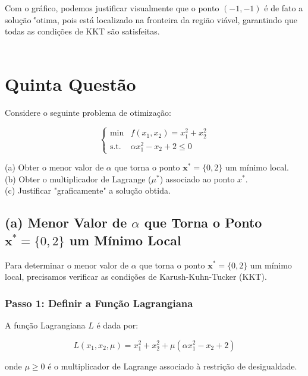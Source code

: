 \documentclass[a4paper, 12pt]{article}
\begin{document}
Com o gr\'afico, podemos justificar visualmente que o ponto $(-1, -1)$ \'e de fato a solu\c{c}\~ao \''otima, pois est\'a localizado na fronteira da regi\~ao vi\'avel, garantindo que todas as condi\c{c}\~oes de KKT s\~ao satisfeitas.\\\\


\section{Quinta Questão}

Considere o seguinte problema de otimiza\c{c}\~ao:

\begin{equation*}
    \begin{cases}
        \text{min} & f(x_1, x_2) = x_1^2 + x_2^2 \\
        \text{s.t.} & \alpha x_1^2 - x_2 + 2 \leq 0
    \end{cases}
\end{equation*}

(a) Obter o menor valor de $\alpha$ que torna o ponto $\mathbf{x}^*= \{0, 2\}$ um m\'inimo local.\\
(b) Obter o multiplicador de Lagrange ($\mu^*$) associado ao ponto $x^*$.\\
(c) Justificar "graficamente" a solu\c{c}\~ao obtida.

\subsection{(a) Menor Valor de $\alpha$ que Torna o Ponto $\mathbf{x}^*=\{0,2\}$ um Mínimo Local}

Para determinar o menor valor de $\alpha$ que torna o ponto $\mathbf{x}^*= \{0, 2\}$ um m\'inimo local, precisamos verificar as condi\c{c}\~oes de Karush-Kuhn-Tucker (KKT).

\subsubsection{Passo 1: Definir a Fun\c{c}\~ao Lagrangiana}
A fun\c{c}\~ao Lagrangiana \(L\) \'e dada por:

\begin{equation*}
    L(x_1, x_2, \mu) = x_1^2 + x_2^2 + \mu (\alpha x_1^2 - x_2 + 2)
\end{equation*}

onde $\mu \geq 0$ \'e o multiplicador de Lagrange associado \`a restri\c{c}\~ao de desigualdade.
\end{document}
